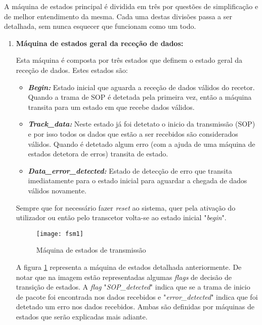 A máquina de estados principal é dividida em três por questões de simplificação e de melhor entendimento da mesma. Cada uma destas divisões passa a ser detalhada, sem nunca esquecer que funcionam como um todo.

\begin{enumerate}
	\item \textbf{Máquina de estados geral da receção de dados:}
	
	Esta máquina é composta por três estados que definem o estado geral da receção de dados. Estes estados são:
	\begin{itemize}
		\item \textbf{\textit{Begin:}} Estado inicial que aguarda a receção de dados válidos do recetor. Quando a trama de SOP é detetada pela primeira vez, então a máquina transita para um estado em que recebe dados válidos. 
		
		\item \textbf{\textit{Track\_data:}} Neste estado já foi detetato o inicio da transmissão (SOP) e por isso todos os dados que estão a ser recebidos são considerados válidos. Quando é detetado algum erro (com a ajuda de uma máquina de estados detetora de erros) transita de estado.
		
		\item \textbf{\textit{Data\_error\_detected:} }Estado de detecção de erro que transita imediatamente para o estado inicial para aguardar a chegada de dados válidos novamente.
	\end{itemize}

	Sempre que for necessário fazer \textit{reset} ao sistema, quer pela ativação do utilizador ou então pelo transcetor volta-se ao estado inicial "\textit{begin}".
	
	
	\begin{figure}[h!]
		\begin{center}
			\leavevmode
			\texttt{[image: fsm1]}
			\captionsetup{width=1.0\linewidth}
			\caption[Máquina de estados de transmissão]{Máquina de estados de transmissão}
			\label{fig:FSM1}
	\end{center}
	\end{figure}
	
	A figura \ref{fig:FSM1} representa a máquina de estados detalhada anteriormente. De notar que na imagem estão representadas algumas \textit{flags} de decisão de transição de estados. A \textit{flag} "\textit{SOP\_detected}" indica que se a trama de inicio de pacote foi encontrada nos dados recebidos e "\textit{error\_detected}" indica que foi detetado um erro nos dados recebidos. Ambas são definidas por máquinas de estados que serão explicadas mais adiante.
	

\end{enumerate}
